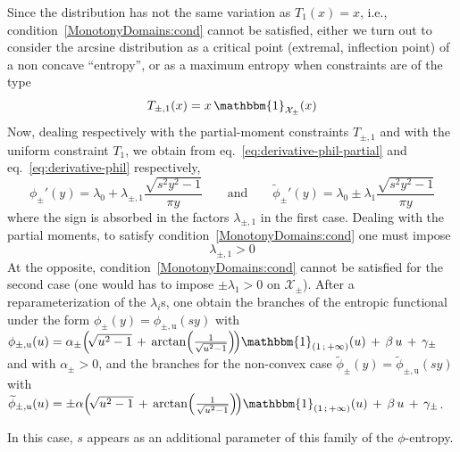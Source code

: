\documentclass[entropy,article,submit,moreauthors,pdftex]{Definitions/mdpi}
\newcommand{\SZ}[1]{{\color{blue} #1}}                                       %
\def\X{\mathcal{X}}%
\def\un{\mathbbm{1}}%
\def\u{\mathrm{u}}
\begin{document}
\SZ{Since the  distribution has not  the same variation  as $T_1(x) =  x$, i.e.,
  condition~\ref{MonotonyDomains:cond} cannot  be satisfied, either we  turn out
  to consider the arcsine distribution as a critical point (extremal, inflection
  point) of a non concave ``entropy'',  or as a maximum entropy when constraints
  are of the type
%
\[
T_{\pm,1}(x) = x \, \un_{\X_\pm}(x)
\]
%
Now, dealing  respectively with  the partial-moment constraints  $T_{\pm,1}$ and
with     the      uniform     constraint      $T_1$,     we      obtain     from
eq.~\eqref{eq:derivative-phil-partial}     and    eq.~\eqref{eq:derivative-phil}
respectively,
%
\[
\phi_\pm'(y)  = \lambda_0  + \lambda_{\pm,1}  \frac{\sqrt{s^2 y^2  - 1}}{\pi  y}
\qquad  \mbox{and} \qquad  \widetilde{\phi}_\pm'(y)  =  \lambda_0 \pm  \lambda_1
\frac{\sqrt{s^2 y^2 - 1}}{\pi y}
\]
%
where the sign  is absorbed in the factors $\lambda_{\pm,1}$  in the first case.
Dealing       with       the       partial       moments,       to       satisfy
condition~\ref{MonotonyDomains:cond} one must impose  $$\lambda_{\pm,1} > 0$$ At
the opposite,  condition~\ref{MonotonyDomains:cond} cannot be satisfied  for the
second case (one would  has to impose $\pm \lambda_1 > 0$  on $\X_\pm$). After a
reparameterization of the  $\lambda_i$s, one obtain the branches  of the entropic
functional   under   the   form   $\phi_\pm(y)  =   \phi_{\pm,\u}(s   y)$   with
$\phi_{\pm,\u}(u) = \alpha_\pm  \left( \!  \sqrt{u^2 - 1} \,  + \, \arctan\left(
\frac{1}{\sqrt{u^2  - 1}}  \right) \!   \right) \un_{\left(  1 \,  ; \,  +\infty
  \right)}(u) \, + \, \beta \, u \,  + \, \gamma_\pm$ and with $\alpha_\pm > 0$,
and   the  branches   for   the  non-convex   case  $\widetilde{\phi}_\pm(y)   =
\widetilde{\phi}_{\pm,\u}(s y)$ with  $\widetilde{\phi}_{\pm,\u}(u) = \pm \alpha
\left( \! \sqrt{u^2 - 1} \,  + \, \arctan\left( \frac{1}{\sqrt{u^2 - 1}} \right)
\! \right) \un_{\left( 1 \, ; \, +\infty \right)}(u)  \, + \, \beta \, u \, + \,
\gamma_\pm$.

In  this case,  $s$ appears  as an  additional parameter  of this  family of  the
$\phi$-entropy.

}
\end{document}
